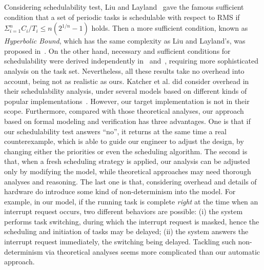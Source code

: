 \documentclass[10pt,journal]{IEEEtran}
\begin{document}
{Considering schedulability test, Liu and
Layland~\cite{DBLP:journals/jacm/LiuL73} gave the famous sufficient
condition that a set of periodic tasks is schedulable with respect to
RMS if $\displaystyle \Sigma^n_{i=1} C_i/T_i \le n(2^{1/n}-1)$
holds. Then a more sufficient condition, known as \emph{Hyperbolic
  Bound}, which has the same complexity as Liu and Layland's, was
proposed in~\cite{DBLP:journals/tc/BiniBB03}. On the other hand,
necessary and sufficient conditions for schedulability were derived
independently in~\cite{DBLP:journals/rts/SpruntSL89}
and~\cite{audsley1993deadline}, requiring more sophisticated analysis
on the task set. Nevertheless, all these results take no overhead into
account, being not as realistic as ours. Katcher et al. did consider
overhead in their schedulability analysis, under several models based
on different kinds of popular
implementations~\cite{DBLP:journals/tse/KatcherAS93}.  However, our
target implementation is not in their scope. Furthermore, compared
with those theoretical analyses, our approach based on formal modeling
and verification has three advantages. One is that if our
schedulability test answers ``no'', it returns at the same time a real
counterexample, which is able to guide our engineer to adjust the
design, by changing either the priorities or even the scheduling
algorithm. The second is that, when a fresh scheduling strategy is
applied, our analysis can be adjusted only by modifying the model,
while theoretical approaches may need thorough analyses and reasoning.
The last one is that, considering overhead and details of hardware do
introduce some kind of non-determinism into the model. For example, in
our model, if the running task is complete \emph{right} at the time
when an interrupt request occurs, two different behaviors are
possible: (i) the system performs task switching, during which the
interrupt request is masked, hence the scheduling and initiation of
tasks may be delayed; (ii) the system answers the interrupt request
immediately, the switching being delayed. Tackling such
non-determinism via theoretical analyses seems more complicated than
our automatic approach.

}
\end{document}
